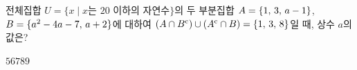 전체집합 $U=\{x \mid x$는 $20$ 이하의 자연수$\}$의 두 부분집합 $A=\{1,\mkern3mu 3,\mkern3mu a-1\}$, $B=\{a^2-4a-7,\mkern3mu a+2\}$에 대하여 $(A\cap{B}^{\mathrm{c}})\cup({A}^{\mathrm{c}}\cap B)=\{1,\mkern3mu 3,\mkern3mu 8\}$일 때, 상수 $a$의 값은?
\begin{choices32}{$5$}{$6$}{$7$}{$8$}{$9$}\end{choices32}
